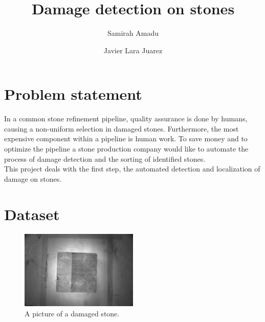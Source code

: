 \documentclass[
a4paper, 
10pt         %
]{article}  %
\title{Damage detection on stones}
\author{Samirah Amadu \and
Javier Lara Juarez }
\date{}
\begin{document}
 \maketitle



\section{Problem statement}
In a common stone refinement pipeline, quality assurance is done by humans, causing a non-uniform selection in damaged stones. Furthermore, the most expensive component within a pipeline is human work. To save money and to optimize the pipeline a stone production company would like to automate the process of damage detection and the sorting of identified stones.\\

This project deals with the first step, the automated detection and localization of damage on stones.

\section{Dataset}
\begin{figure}
 \vspace{-20pt}
  \begin{center}
    \includegraphics[width=0.5\textwidth]{example.jpg}
  \end{center}
  \vspace{-15pt}
  \caption{A picture of a damaged stone.}
\end{figure}
\end{document}

